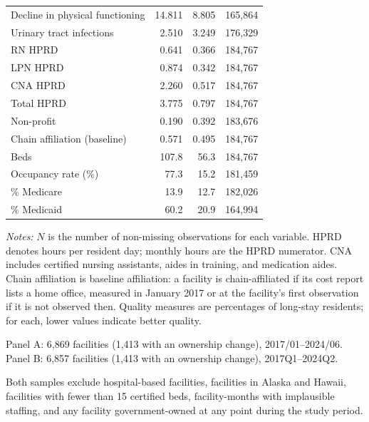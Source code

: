 \begin{table}[!ht]
\begin{threeparttable}
\begin{tabularx}{\textwidth}{@{} X r r r @{} }
Decline in physical functioning & 14.811 & 8.805 & 165,864 \\
Urinary tract infections & 2.510 & 3.249 & 176,329 \\
\addlinespace[0.4em]
RN HPRD & 0.641 & 0.366 & 184,767 \\
LPN HPRD & 0.874 & 0.342 & 184,767 \\
CNA HPRD & 2.260 & 0.517 & 184,767 \\
Total HPRD & 3.775 & 0.797 & 184,767 \\
\addlinespace[0.4em]
Non-profit & 0.190 & 0.392 & 183,676 \\
Chain affiliation (baseline) & 0.571 & 0.495 & 184,767 \\
Beds & 107.8 & 56.3 & 184,767 \\
Occupancy rate (\%) & 77.3 & 15.2 & 181,459 \\
\% Medicare & 13.9 & 12.7 & 182,026 \\
\% Medicaid & 60.2 & 20.9 & 164,994 \\
\bottomrule
\end{tabularx}

\begin{tablenotes}[flushleft]
\footnotesize
\item \textit{Notes:} $N$ is the number of non-missing observations for each variable. HPRD denotes hours per resident day; monthly hours are the HPRD numerator. CNA includes certified nursing assistants, aides in training, and medication aides. Chain affiliation is baseline affiliation: a facility is chain-affiliated if its cost report lists a home office, measured in January 2017 or at the facility's first observation if it is not observed then. Quality measures are percentages of long-stay residents; for each, lower values indicate better quality.
\item Panel A: 6,869 facilities (1,413 with an ownership change), 2017/01--2024/06. Panel B: 6,857 facilities (1,413 with an ownership change), 2017Q1--2024Q2.
\item Both samples exclude hospital-based facilities, facilities in Alaska and Hawaii, facilities with fewer than 15 certified beds, facility-months with implausible staffing, and any facility government-owned at any point during the study period.
\end{tablenotes}

\end{threeparttable}
\end{table}
